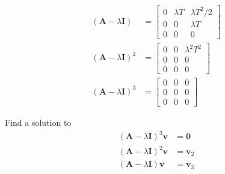 \begin{align*}
 (\mathbf{A}-\lambda\mathbf{I}) &= \begin{bmatrix}
        0 & \lambda T & \lambda T^2 / 2 \\
        0 & 0 & \lambda T \\
        0 & 0 & 0
    \end{bmatrix}\\
 (\mathbf{A}-\lambda\mathbf{I})^2 &= \begin{bmatrix}
                                      0 & 0 & \lambda^2 T^2\\
                                      0 & 0 & 0\\
                                      0 & 0 & 0
                                     \end{bmatrix}
\\
 (\mathbf{A}-\lambda\mathbf{I})^3 &= \begin{bmatrix}
                                      0 & 0 & 0\\
                                      0 & 0 & 0\\
                                      0 & 0 & 0
                                     \end{bmatrix}
\end{align*}

Find a solution to
\begin{align*}
(\mathbf{A}-\lambda \mathbf{I})^3 \mathbf{v}& = \mathbf{0} \\
(\mathbf{A}-\lambda \mathbf{I})^2 \mathbf{v}& = \mathbf{v}_2 \\
(\mathbf{A}-\lambda \mathbf{I}) \mathbf{v}& = \mathbf{v}_3 \\
\end{align*}


